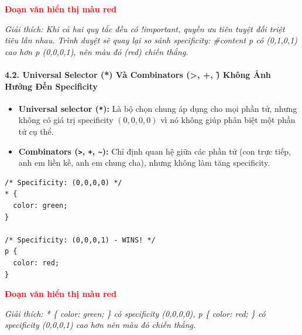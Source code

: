 \documentclass[11pt,oneside]{book}
\newcommand{\codeinline}[1]{\textcolor{accentOrange}{\texttt{#1}}}
\begin{document}
\begin{browserWindow}
\sffamily\small
\textcolor{red}{\textbf{Đoạn văn hiển thị màu red}} \par\vspace{4pt}
{\scriptsize\textcolor{gray!60}{\textit{Giải thích: Khi cả hai quy tắc đều có !important, quyền ưu tiên tuyệt đối triệt tiêu lẫn nhau. Trình duyệt sẽ quay lại so sánh specificity: \#content p có (0,1,0,1) cao hơn p (0,0,0,1), nên màu đỏ (red) chiến thắng.}}}
\end{browserWindow}

\paragraph{4.2. Universal Selector (*) Và Combinators (>, +, \~) Không Ảnh Hưởng Đến Specificity}

\begin{conceptBox}
\begin{itemize}[leftmargin=1.5em, itemsep=3pt, parsep=0pt]
    \item \textbf{Universal selector (\codeinline{*}):} Là bộ chọn chung áp dụng cho mọi phần tử, nhưng không có giá trị specificity $(0,0,0,0)$ vì nó không giúp phân biệt một phần tử cụ thể.
    \item \textbf{Combinators (\codeinline{>}, \codeinline{+}, \codeinline{\~{}}):} Chỉ định quan hệ giữa các phần tử (con trực tiếp, anh em liền kề, anh em chung cha), nhưng không làm tăng specificity.
\end{itemize}
\end{conceptBox}

\begin{codeWindow}
\begin{lstlisting}[language=CSS3]
/* Specificity: (0,0,0,0) */
* {
  color: green;
}

/* Specificity: (0,0,0,1) - WINS! */
p {
  color: red;
}
\end{lstlisting}
\end{codeWindow}

\begin{browserWindow}
\sffamily\small
\textcolor{red}{\textbf{Đoạn văn hiển thị màu red}} \par\vspace{4pt}
{\scriptsize\textcolor{gray!60}{\textit{Giải thích: * \{ color: green; \} có specificity (0,0,0,0), p \{ color: red; \} có specificity (0,0,0,1) cao hơn nên màu đỏ chiến thắng.}}}
\end{browserWindow}
\end{document}
